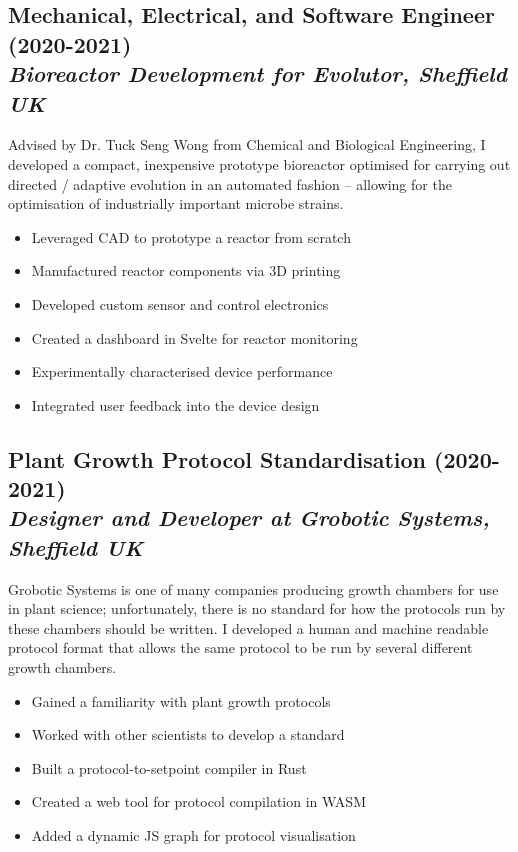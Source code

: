 \documentclass[twocolumn, a4paper, fontsize=9pt, headsepline, footsepline]{scrartcl}
\begin{document}
\subsection*{Mechanical, Electrical, and Software Engineer
  (2020-2021)\\\textmd{\emph{Bioreactor Development for Evolutor, Sheffield UK}}}
\noindent
Advised by Dr. Tuck Seng Wong from Chemical and Biological Engineering, I
developed a compact, inexpensive prototype bioreactor optimised for carrying out
directed / adaptive evolution in an automated fashion – allowing for the
optimisation of industrially important microbe strains.
\begin{itemize}
\item Leveraged CAD to prototype a reactor from scratch
\item Manufactured reactor components via 3D printing
\item Developed custom sensor and control electronics
\item Created a dashboard in Svelte for reactor monitoring
\item Experimentally characterised device performance
\item Integrated user feedback into the device design
\end{itemize}

\subsection*{Plant Growth Protocol Standardisation
  (2020-2021)\\\textmd{\emph{Designer and Developer at Grobotic Systems, Sheffield UK}}}
\noindent
Grobotic Systems is one of many companies producing growth chambers for use in
plant science; unfortunately, there is no standard for how the protocols run by
these chambers should be written. I developed a human and machine readable
protocol format that allows the same protocol to be run by several different
growth chambers.
\begin{itemize}
\item Gained a familiarity with plant growth protocols
\item Worked with other scientists to develop a standard
\item Built a protocol-to-setpoint compiler in Rust
\item Created a web tool for protocol compilation in WASM
\item Added a dynamic JS graph for protocol visualisation
\end{itemize}
\end{document}
